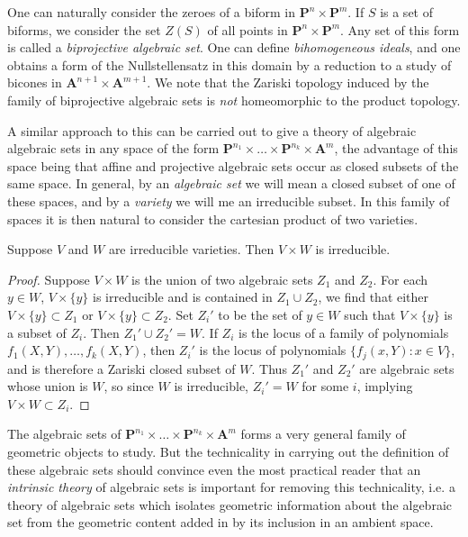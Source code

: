 One can naturally consider the zeroes of a biform in $\mathbf{P}^n \times \mathbf{P}^m$. If $S$ is a set of biforms, we consider the set $Z(S)$ of all points in $\mathbf{P}^n \times \mathbf{P}^m$. Any set of this form is called a \emph{biprojective algebraic set}. One can define \emph{bihomogeneous ideals}, and one obtains a form of the Nullstellensatz in this domain by a reduction to a study of bicones in $\mathbf{A}^{n+1} \times \mathbf{A}^{m+1}$. We note that the Zariski topology induced by the family of biprojective algebraic sets is \emph{not} homeomorphic to the product topology. 

A similar approach to this can be carried out to give a theory of algebraic algebraic sets in any space of the form $\mathbf{P}^{n_1} \times \dots \times \mathbf{P}^{n_k} \times \mathbf{A}^m$, the advantage of this space being that affine and projective algebraic sets occur as closed subsets of the same space. In general, by an \emph{algebraic set} we will mean a closed subset of one of these spaces, and by a \emph{variety} we will me an irreducible subset. In this family of spaces it is then natural to consider the cartesian product of two varieties.

\begin{theorem}
    Suppose $V$ and $W$ are irreducible varieties. Then $V \times W$ is irreducible.
\end{theorem}
\begin{proof}
    Suppose $V \times W$ is the union of two algebraic sets $Z_1$ and $Z_2$. For each $y \in W$, $V \times \{ y \}$ is irreducible and is contained in $Z_1 \cup Z_2$, we find that either $V \times \{ y \} \subset Z_1$ or $V \times \{ y \} \subset Z_2$. Set $Z_i'$ to be the set of $y \in W$ such that $V \times \{ y \}$ is a subset of $Z_i$. Then $Z_1' \cup Z_2' = W$. If $Z_i$ is the locus of a family of polynomials $f_1(X,Y),\dots,f_k(X,Y)$, then $Z_i'$ is the locus of polynomials $\{ f_j(x,Y) : x \in V \}$, and is therefore a Zariski closed subset of $W$. Thus $Z_1'$ and $Z_2'$ are algebraic sets whose union is $W$, so since $W$ is irreducible, $Z_i' = W$ for some $i$, implying $V \times W \subset Z_i$.
\end{proof}

The algebraic sets of $\mathbf{P}^{n_1} \times \dots \times \mathbf{P}^{n_k} \times \mathbf{A}^m$ forms a very general family of geometric objects to study. But the technicality in carrying out the definition of these algebraic sets should convince even the most practical reader that an \emph{intrinsic theory} of algebraic sets is important for removing this technicality, i.e. a theory of algebraic sets which isolates geometric information about the algebraic set from the geometric content added in by its inclusion in an ambient space.














